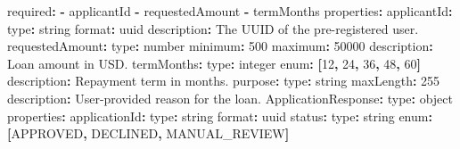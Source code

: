 \documentclass[
  11pt,
  openany,
  oneside]{book}
\newenvironment{Shaded}{}{}
\newcommand{\AttributeTok}[1]{\textcolor[rgb]{0.49,0.56,0.16}{#1}}
\newcommand{\DecValTok}[1]{\textcolor[rgb]{0.25,0.63,0.44}{#1}}
\newcommand{\FunctionTok}[1]{\textcolor[rgb]{0.02,0.16,0.49}{#1}}
\newcommand{\KeywordTok}[1]{\textcolor[rgb]{0.00,0.44,0.13}{\textbf{#1}}}
\begin{document}
\begin{Shaded}
\begin{Highlighting}[]
\AttributeTok{      }\FunctionTok{required}\KeywordTok{:}
\AttributeTok{        }\KeywordTok{{-}}\AttributeTok{ applicantId}
\AttributeTok{        }\KeywordTok{{-}}\AttributeTok{ requestedAmount}
\AttributeTok{        }\KeywordTok{{-}}\AttributeTok{ termMonths}
\AttributeTok{      }\FunctionTok{properties}\KeywordTok{:}
\AttributeTok{        }\FunctionTok{applicantId}\KeywordTok{:}
\AttributeTok{          }\FunctionTok{type}\KeywordTok{:}\AttributeTok{ string}
\AttributeTok{          }\FunctionTok{format}\KeywordTok{:}\AttributeTok{ uuid}
\AttributeTok{          }\FunctionTok{description}\KeywordTok{:}\AttributeTok{ The UUID of the pre{-}registered user.}
\AttributeTok{        }\FunctionTok{requestedAmount}\KeywordTok{:}
\AttributeTok{          }\FunctionTok{type}\KeywordTok{:}\AttributeTok{ number}
\AttributeTok{          }\FunctionTok{minimum}\KeywordTok{:}\AttributeTok{ }\DecValTok{500}
\AttributeTok{          }\FunctionTok{maximum}\KeywordTok{:}\AttributeTok{ }\DecValTok{50000}
\AttributeTok{          }\FunctionTok{description}\KeywordTok{:}\AttributeTok{ Loan amount in USD.}
\AttributeTok{        }\FunctionTok{termMonths}\KeywordTok{:}
\AttributeTok{          }\FunctionTok{type}\KeywordTok{:}\AttributeTok{ integer}
\AttributeTok{          }\FunctionTok{enum}\KeywordTok{:}\AttributeTok{ }\KeywordTok{[}\DecValTok{12}\KeywordTok{,}\AttributeTok{ }\DecValTok{24}\KeywordTok{,}\AttributeTok{ }\DecValTok{36}\KeywordTok{,}\AttributeTok{ }\DecValTok{48}\KeywordTok{,}\AttributeTok{ }\DecValTok{60}\KeywordTok{]}
\AttributeTok{          }\FunctionTok{description}\KeywordTok{:}\AttributeTok{ Repayment term in months.}
\AttributeTok{        }\FunctionTok{purpose}\KeywordTok{:}
\AttributeTok{          }\FunctionTok{type}\KeywordTok{:}\AttributeTok{ string}
\AttributeTok{          }\FunctionTok{maxLength}\KeywordTok{:}\AttributeTok{ }\DecValTok{255}
\AttributeTok{          }\FunctionTok{description}\KeywordTok{:}\AttributeTok{ User{-}provided reason for the loan.}
\AttributeTok{    }\FunctionTok{ApplicationResponse}\KeywordTok{:}
\AttributeTok{      }\FunctionTok{type}\KeywordTok{:}\AttributeTok{ object}
\AttributeTok{      }\FunctionTok{properties}\KeywordTok{:}
\AttributeTok{        }\FunctionTok{applicationId}\KeywordTok{:}
\AttributeTok{          }\FunctionTok{type}\KeywordTok{:}\AttributeTok{ string}
\AttributeTok{          }\FunctionTok{format}\KeywordTok{:}\AttributeTok{ uuid}
\AttributeTok{        }\FunctionTok{status}\KeywordTok{:}
\AttributeTok{          }\FunctionTok{type}\KeywordTok{:}\AttributeTok{ string}
\AttributeTok{          }\FunctionTok{enum}\KeywordTok{:}\AttributeTok{ }\KeywordTok{[}\AttributeTok{APPROVED}\KeywordTok{,}\AttributeTok{ DECLINED}\KeywordTok{,}\AttributeTok{ MANUAL\_REVIEW}\KeywordTok{]}

\end{Highlighting}
\end{Shaded}
\end{document}
